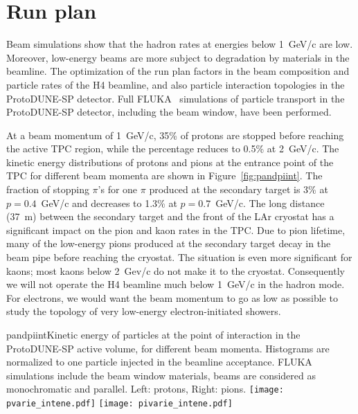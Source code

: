 \section{Run plan}
\label{sec:runplan}


Beam simulations show that the hadron rates at 
energies below 1~GeV/c are low. Moreover, low-energy beams are more
subject to degradation by materials in the
beamline.  The optimization of the run plan factors in the beam composition and particle rates of the H4 beamline, and 
also particle interaction topologies in the ProtoDUNE-SP detector. Full FLUKA~%
simulations of particle transport in the ProtoDUNE-SP detector, including the
beam window, have been performed.


At a beam momentum of 1~GeV/c, 35\% of protons are stopped before reaching the active TPC region, while the percentage reduces to 0.5\% at 2~GeV/c.  The kinetic energy distributions of protons and pions at the entrance point of the TPC for different beam momenta are shown in Figure~\ref{fig:pandpiint}. 
The fraction of stopping $\pi$'s for one $\pi$
produced at the secondary target is 3\% at $p=0.4$~GeV/c and decreases to 1.3\% at $p=0.7$~GeV/c.
The long distance (37~m) between the secondary target and the front of the LAr cryostat has a significant impact on the pion and kaon rates in the TPC. Due to pion lifetime, many of the  low-energy pions produced at the secondary target decay in the beam pipe before reaching the cryostat. The situation is even more significant for kaons; most kaons below 2~Gev/c do not make it to the cryostat.
Consequently we will not operate the H4 beamline much below 1~GeV/c in the hadron mode.
For electrons, we would want the beam momentum to go as low as possible to study the topology of very low-energy electron-initiated 
showers.
\begin{cdrfigure}{pandpiint}{Kinetic energy of
    particles at the point of interaction in the ProtoDUNE-SP active
    volume, for different beam momenta. Histograms are normalized to one particle injected in the
    beamline acceptance. FLUKA simulations include the beam window
    materials, beams are considered as monochromatic and
    parallel. Left: protons, Right: pions.}
  \texttt{[image: pvarie\_intene.pdf]}
  \texttt{[image: pivarie\_intene.pdf]}
\end{cdrfigure}



